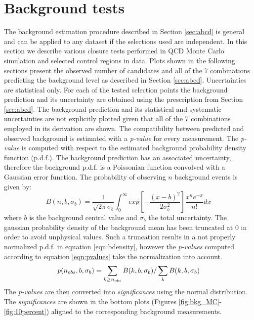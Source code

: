 \section{Background tests}
\label{sec:backgroundtests}
The background estimation procedure described in Section \ref{sec:abcd} is general and can be applied
to any dataset if the selections used are independent.
In this section we describe various closure tests performed in QCD Monte Carlo simulation and 
selected control regions in data. Plots shown in the following sections present the observed number
of candidates and all of the 7 combinations predicting the background level as described
 in Section \ref{sec:abcd}.
Uncertainties are statistical only. For each of the tested selection points the background prediction 
and its uncertainty are obtained 
using the prescription from Section \ref{sec:abcd}. The background prediction and its statistical 
and systematic uncertainties are
 not explicitly plotted given that all of the 7 combinations employed in its derivation are shown.  
The compatibility between predicted and observed background is estimated with a {\it p-value} for every measurement. 
 The {\it p-value}
is computed with respect to the estimated background probability density function (p.d.f.). 
The background prediction has an associated uncertainty, 
therefore the background p.d.f. is a Poissonian function convolved  
with a Gaussian error function. The probability of observing $n$ background events is given by:
\begin{equation}
B(n,b,\sigma_b)= \frac{1}{\sqrt{2\pi}\sigma_b} \int_{0}^{\infty} 
exp\left[ -\frac{\left(x-b\right)^2}{2\sigma_b^2}\right]\frac{x^n e^{-x}}{n!}dx
\label{eqn:bdensity}
\end{equation}
where $b$ is the background central value and $\sigma_b$ the total uncertainty.
The gaussian probability density of the background mean has been truncated at 
0 in order to avoid unphysical values. Such a truncation results in a not properly normalized p.d.f. in equation 
\ref{eqn:bdensity}, however the {\it p-values} computed according to equation \ref{eqn:pvalues} take the 
normalization into account.   
\begin{equation}
{\it p} (n_{obs},b,\sigma_b) = \sum_{k\geq n_{obs}} B(k,b,\sigma_b) / \sum_{k} B(k,b,\sigma_b)
\label{eqn:pvalues}
\end{equation}
The {\it p-values} are then converted into {\it significances} using the normal
 distribution. The {\it significances} are shown in the bottom plots (Figures 
\ref{fig:bkg_MC}-\ref{fig:10percent}) aligned to the corresponding background
measurements.  

